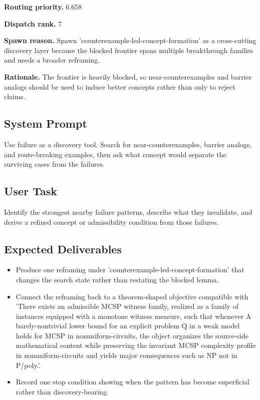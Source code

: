 \documentclass[11pt]{article}
\begin{document}
\textbf{Routing priority.} 6.658

\textbf{Dispatch rank.} 7

\textbf{Spawn reason.} Spawn 'counterexample-led-concept-formation' as a cross-cutting discovery layer because the blocked frontier spans multiple breakthrough families and needs a broader reframing.

\textbf{Rationale.} The frontier is heavily blocked, so near-counterexamples and barrier analogs should be used to induce better concepts rather than only to reject claims.

\subsection*{System Prompt}
Use failure as a discovery tool. Search for near-counterexamples, barrier analogs, and route-breaking examples, then ask what concept would separate the surviving cases from the failures.

\subsection*{User Task}
Identify the strongest nearby failure patterns, describe what they invalidate, and derive a refined concept or admissibility condition from those failures.

\subsection*{Expected Deliverables}
\begin{itemize}[leftmargin=*,itemsep=0.2em]
\item Produce one reframing under 'counterexample-led-concept-formation' that changes the search state rather than restating the blocked lemma.
\item Connect the reframing back to a theorem-shaped objective compatible with 'There exists an admissible MCSP witness family, realized as a family of instances equipped with a monotone witness measure, such that whenever A barely-nontrivial lower bound for an explicit problem Q in a weak model holds for MCSP in nonuniform-circuits, the object organizes the source-side mathematical content while preserving the invariant MCSP complexity profile in nonuniform-circuits and yields major consequences such as NP not in P/poly.'.
\item Record one stop condition showing when the pattern has become superficial rather than discovery-bearing.
\end{itemize}
\end{document}

